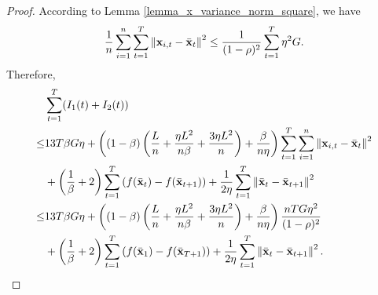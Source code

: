 \documentclass{article}
\begin{document}
\begin{proof}
According to Lemma \ref{lemma_x_variance_norm_square}, we have
\begin{align}
\nonumber
\frac{1}{n}\sum_{i=1}^n \sum_{t=1}^T \left\lVert{\bf x}_{i,t} - \bar{{\bf x}}_t\right\rVert^2 \le \frac{1}{(1-\rho)^2} \sum_{t=1}^T \eta^2 G.
\end{align} Therefore, 
\begin{align}
\nonumber
&\sum_{t=1}^T (I_1(t) + I_2(t)) \\ \nonumber
\le & 13T\beta G \eta + \left(  (1-\beta)  \left(  \frac{L}{n} + \frac{\eta L^2}{n\beta} + \frac{3\eta L^2}{n}  \right) + \frac{\beta}{n\eta}  \right)\sum_{t=1}^T\sum_{i=1}^n\left\lVert{\bf x}_{i,t} - \bar{{\bf x}}_t \right\rVert^2 \\ \nonumber 
&+ \left( \frac{1}{\beta} + 2 \right)\sum_{t=1}^T\left( f(\bar{{\bf x}}_t) - f(\bar{{\bf x}}_{t+1}) \right) + \frac{1}{2\eta}\sum_{t=1}^T\left\lVert \bar{{\bf x}}_t - \bar{{\bf x}}_{t+1}\right\rVert^2 \\ \nonumber
\le & 13T\beta G \eta + \left(  (1-\beta)  \left(  \frac{L}{n} + \frac{\eta L^2}{n\beta} + \frac{3\eta L^2}{n}  \right) + \frac{\beta}{n\eta}  \right) \frac{nT G \eta^2}{(1-\rho)^2} \\ \nonumber 
&+ \left( \frac{1}{\beta} + 2 \right)\sum_{t=1}^T\left( f(\bar{{\bf x}}_1) - f(\bar{{\bf x}}_{T+1}) \right) + \frac{1}{2\eta}\sum_{t=1}^T\left\lVert \bar{{\bf x}}_t - \bar{{\bf x}}_{t+1}\right\rVert^2.
\end{align}







\end{proof}
\end{document}
